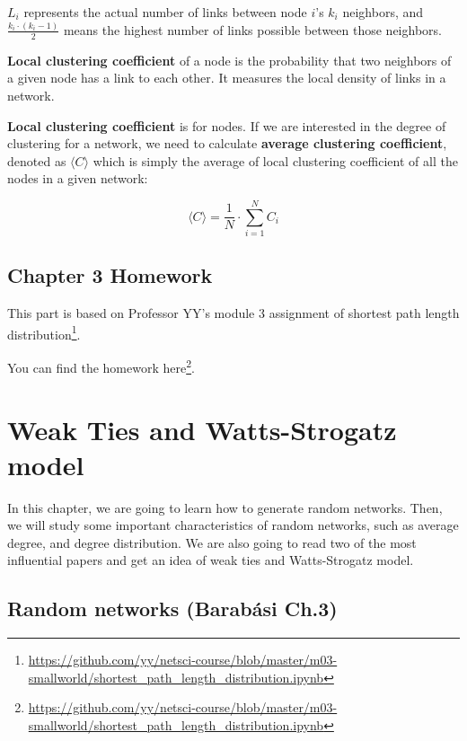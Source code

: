 \documentclass[
]{krantz}
\makeatletter
\renewcommand{\href}[2]{#2\footnote{\url{#1}}}
\newenvironment{kframe}{%
\medskip{}
\setlength{\fboxsep}{.8em}
 \def\at@end@of@kframe{}%
 \ifinner\ifhmode%
  \def\at@end@of@kframe{\end{minipage}}%
  \begin{minipage}{\columnwidth}%
 \fi\fi%
 \def\FrameCommand##1{\hskip\@totalleftmargin \hskip-\fboxsep
 \colorbox{shadecolor}{##1}\hskip-\fboxsep
     \hskip-\linewidth \hskip-\@totalleftmargin \hskip\columnwidth}%
 \MakeFramed {\advance\hsize-\width
   \@totalleftmargin\z@ \linewidth\hsize
   \@setminipage}}%
 {\par\unskip\endMakeFramed%
 \at@end@of@kframe}
\newenvironment{rmdblock}[1]
  {
  \begin{itemize}
  \renewcommand{\labelitemi}{
    \raisebox{-.7\height}[0pt][0pt]{
      {\setkeys{Gin}{width=3em,keepaspectratio}\texttt{[image: images/\#1]}}
    }
  }
  \setlength{\fboxsep}{1em}
  \begin{kframe}
  \item
  }
  {
  \end{kframe}
  \end{itemize}
  }
\newenvironment{rmdnote}
  {\begin{rmdblock}{note}}
  {\end{rmdblock}}
\makeatother
\begin{document}
\(L_i\) represents the actual number of links between node \(i\)'s \(k_i\) neighbors, and \(\frac{k_i \cdot (k_i - 1)}{2}\) means the highest number of links possible between those neighbors.

\textbf{Local clustering coefficient} of a node is the probability that two neighbors of a given node has a link to each other. It measures the local density of links in a network.

\textbf{Local clustering coefficient} is for nodes. If we are interested in the degree of clustering for a network, we need to calculate \textbf{average clustering coefficient}, denoted as \(\langle C \rangle\) which is simply the average of local clustering coefficient of all the nodes in a given network:

\begin{equation}
   \langle C \rangle = \frac{1}{N} \cdot \sum_{i = 1}^N C_i
\label{eq:avergeClustering}
\end{equation}

\hypertarget{chapter-3-homework}{%
\section{Chapter 3 Homework}\label{chapter-3-homework}}

\begin{rmdnote}
This part is based on Professor YY's module 3 assignment of \href{https://github.com/yy/netsci-course/blob/master/m03-smallworld/shortest_path_length_distribution.ipynb}{shortest path length distribution}.
\end{rmdnote}

You can find the homework \href{https://github.com/yy/netsci-course/blob/master/m03-smallworld/shortest_path_length_distribution.ipynb}{here}.

\hypertarget{weak-ties-and-watts-strogatz-model}{%
\chapter{Weak Ties and Watts-Strogatz model}\label{weak-ties-and-watts-strogatz-model}}

In this chapter, we are going to learn how to generate random networks. Then, we will study some important characteristics of random networks, such as average degree, and degree distribution. We are also going to read two of the most influential papers and get an idea of weak ties and Watts-Strogatz model.

\hypertarget{random-networks-barabuxe1si-ch.3}{%
\section{Random networks (Barabási Ch.3)}\label{random-networks-barabuxe1si-ch.3}}
\end{document}
